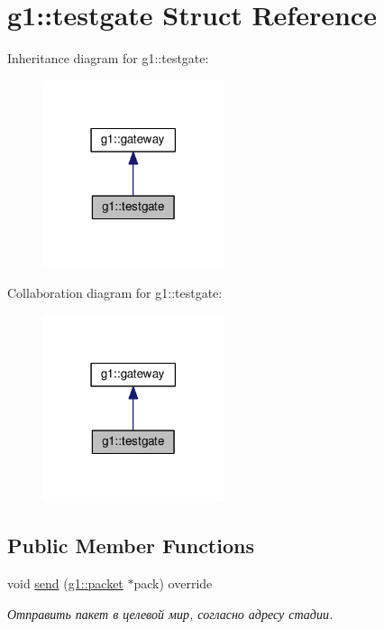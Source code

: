 \hypertarget{structg1_1_1testgate}{}\section{g1\+:\+:testgate Struct Reference}
\label{structg1_1_1testgate}


Inheritance diagram for g1\+:\+:testgate\+:
\nopagebreak
\begin{figure}[H]
\begin{center}
\leavevmode
\includegraphics[width=150pt]{structg1_1_1testgate__inherit__graph}
\end{center}
\end{figure}


Collaboration diagram for g1\+:\+:testgate\+:
\nopagebreak
\begin{figure}[H]
\begin{center}
\leavevmode
\includegraphics[width=150pt]{structg1_1_1testgate__coll__graph}
\end{center}
\end{figure}
\subsection*{Public Member Functions}
\begin{DoxyCompactItemize}
\item 
void \hyperlink{structg1_1_1testgate_a1d66091483f19bc94ec975cbe3240789}{send} (\hyperlink{structg1_1_1packet}{g1\+::packet} $\ast$pack) override
\begin{DoxyCompactList}\small\item\em Отправить пакет в целевой мир, согласно адресу стадии. \end{DoxyCompactList}\end{DoxyCompactItemize}
